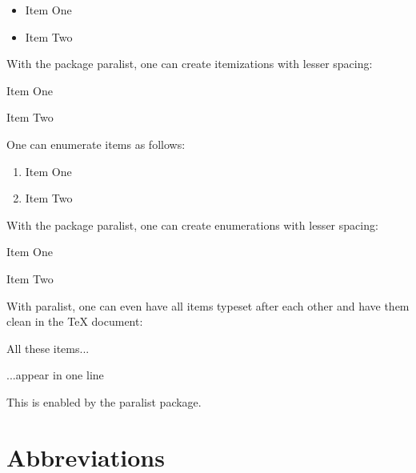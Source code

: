 \begin{ltgexample}
\begin{itemize}
  \item Item One
  \item Item Two
\end{itemize}
\end{ltgexample}

With the package paralist, one can create itemizations with lesser spacing:

\begin{ltgexample}
\begin{compactitem}
  \item Item One
  \item Item Two
\end{compactitem}
\end{ltgexample}

One can enumerate items as follows:

\begin{ltgexample}
\begin{enumerate}
  \item Item One
  \item Item Two
\end{enumerate}
\end{ltgexample}

With the package paralist, one can create enumerations with lesser spacing:

\begin{ltgexample}
\begin{compactenum}
  \item Item One
  \item Item Two
\end{compactenum}
\end{ltgexample}

With paralist, one can even have all items typeset after each other and have them clean in the TeX document:

\begin{ltgexample}
\begin{inparaenum}
  \item All these items...
  \item ...appear in one line
  \item This is enabled by the paralist package.
\end{inparaenum}
\end{ltgexample}

\section{Abbreviations}

